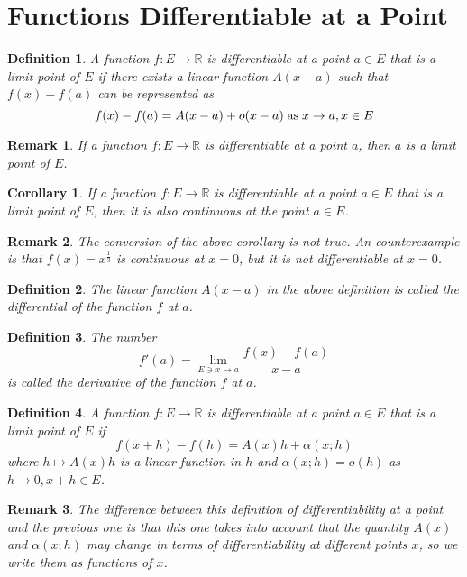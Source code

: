 \documentclass[onecolumn]{ctexart}
\newtheorem{definition}{Definition}
\newtheorem{corollary}{Corollary}
\newtheorem{remark}{Remark}
\begin{document}
\section{Functions Differentiable at a Point}

\begin{definition}
  A function $f:E \to \mathbb{R}$ is differentiable at a point $a \in E$ that is 
  a limit point of $E$ if there exists a linear function $A(x - a)$ such that 
  $f(x) - f(a)$ can be represented as
  \begin{equation}
    f(x) - f(a) = A (x - a) + o(x - a) \thickspace \textnormal{as} \thickspace x \to a, x \in E
  \end{equation}
\end{definition}
\begin{remark}
  If a function $f:E \to \mathbb{R}$ is differentiable at a point $a$, then $a$ 
  is a limit point of $E$.
\end{remark}

\begin{corollary}
  If a function $f:E \to \mathbb{R}$ is differentiable at a point $a \in E$ that 
  is a limit point of $E$, then it is also continuous at the point $a \in E$.
\end{corollary}
\begin{remark}
  The conversion of the above corollary is not true. An counterexample is that 
  $f(x) = x^{\frac{1}{3}}$ is continuous at $x = 0$, but it is not 
  differentiable at $x = 0$.
\end{remark}

\begin{definition}
  The linear function $A (x - a)$ in the above definition is called the 
  differential of the function $f$ at $a$.
\end{definition}

\begin{definition}
  The number
  \begin{equation}
    f'(a) = \lim_{E \owns x \to a} \frac{f(x) - f(a)}{x - a}
  \end{equation}
  is called the derivative of the function $f$ at $a$.
\end{definition}

\begin{definition}
  A function $f:E \to \mathbb{R}$ is differentiable at a point $a \in E$ that is 
  a limit point of $E$ if
  \begin{equation}
    f(x + h) - f(h) = A(x)h + \alpha(x;h)
  \end{equation}
  where $h \mapsto A(x)h$ is a linear function in $h$ and $\alpha(x;h) = o(h)$ 
  as $h \to 0, x + h \in E$.
\end{definition}
\begin{remark}
  The difference between this definition of differentiability at a point and the 
  previous one is that this one takes into account that the quantity $A(x)$ and 
  $\alpha(x;h)$ may change in terms of differentiability at different points $x$, 
  so we write them as functions of $x$.
\end{remark}
\end{document}
